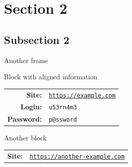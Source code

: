 \documentclass[10pt,svgnames,fragile]{beamer}
\begin{document}
\section{Section 2}

\subsection{Subsection 2}

\begin{frame}{Another frame}

  \begin{block}{Block with aligned information}
    \begin{tabular}{ r l }
      \textbf{Site:} &  \texttt{\href{https://example.com}{https://example.com}} \\
      \textbf{Login:} &  \texttt{u53rn4m3} \\
      \textbf{Password:} &  \texttt{p@ssword} \\
    \end{tabular}
  \end{block}

  \begin{block}{Another block}
    \begin{tabular}{ r l }
      \textbf{Site:} & \texttt{\href{https://another-example.com}{https://another-example.com}} \\
    \end{tabular}
  \end{block}
\end{frame}
\end{document}
